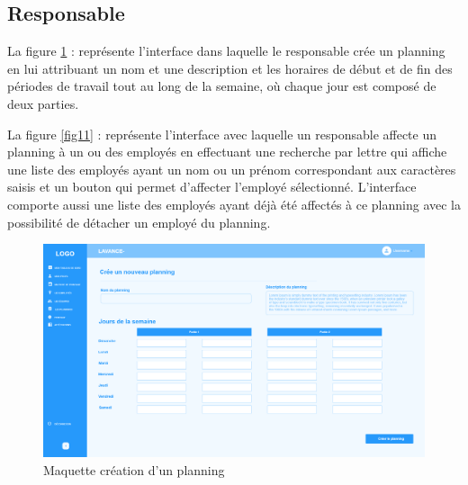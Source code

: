     
        \subsection{Responsable}
        La figure \ref{fig10} : représente l’interface dans laquelle le responsable crée un planning en lui attribuant un nom et une description et les horaires de début et de fin des périodes de travail tout au long de la semaine, où chaque jour est composé de deux parties.
         
        La figure \ref{fig11} : représente l’interface avec laquelle un responsable affecte un planning à un ou des employés en effectuant une recherche par lettre qui affiche une liste des employés ayant un nom ou un prénom correspondant aux caractères saisis et un bouton qui permet d’affecter l’employé sélectionné. L’interface comporte aussi une liste des employés ayant déjà été affectés à ce planning avec la possibilité de détacher un employé du planning. 
        
        \clearpage
       
        \begin{figure}[h!]
         \centering
      \includegraphics[width=18cm]{images/add_panning.png}
         \caption{Maquette création d'un planning}
         \label{fig10}
        \end{figure}
        

